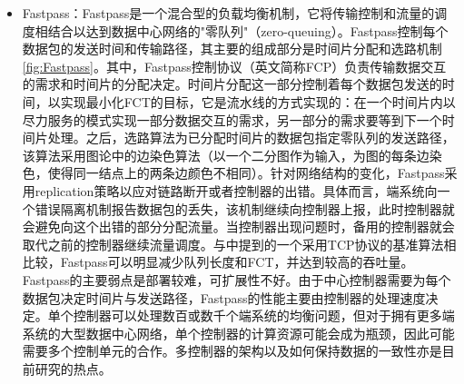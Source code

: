 \begin{itemize}
    \item Fastpass\cite{perry2014Fastpass}：Fastpass是一个混合型的负载均衡机制，它将传输控制和流量的调度相结合以达到数据中心网络的"零队列"（zero-queuing）。Fastpass控制每个数据包的发送时间和传输路径，其主要的组成部分是时间片分配和选路机制\ref{fig:Fastpass}。其中，Fastpass控制协议（英文简称FCP）负责传输数据交互的需求和时间片的分配决定。时间片分配这一部分控制着每个数据包发送的时间，以实现最小化FCT的目标，它是流水线的方式实现的：在一个时间片内以尽力服务的模式实现一部分数据交互的需求，另一部分的需求要等到下一个时间片处理。之后，选路算法为已分配时间片的数据包指定零队列的发送路径，该算法采用图论中的边染色算法（以一个二分图作为输入，为图的每条边染色，使得同一结点上的两条边颜色不相同）。针对网络结构的变化，Fastpass采用replication策略以应对链路断开或者控制器的出错。具体而言，端系统向一个错误隔离机制报告数据包的丢失，该机制继续向控制器上报，此时控制器就会避免向这个出错的部分分配流量。当控制器出现问题时，备用的控制器就会取代之前的控制器继续流量调度。与\cite{perry2014Fastpass}中提到的一个采用TCP协议的基准算法相比较，Fastpass可以明显减少队列长度和FCT，并达到较高的吞吐量。Fastpass的主要弱点是部署较难，可扩展性不好。由于中心控制器需要为每个数据包决定时间片与发送路径，Fastpass的性能主要由控制器的处理速度决定。单个控制器可以处理数百或数千个端系统的均衡问题，但对于拥有更多端系统的大型数据中心网络，单个控制器的计算资源可能会成为瓶颈，因此可能需要多个控制单元的合作。多控制器的架构以及如何保持数据的一致性亦是目前研究的热点\cite{dixit2013towards,berde2014onos}。
\end{itemize}

